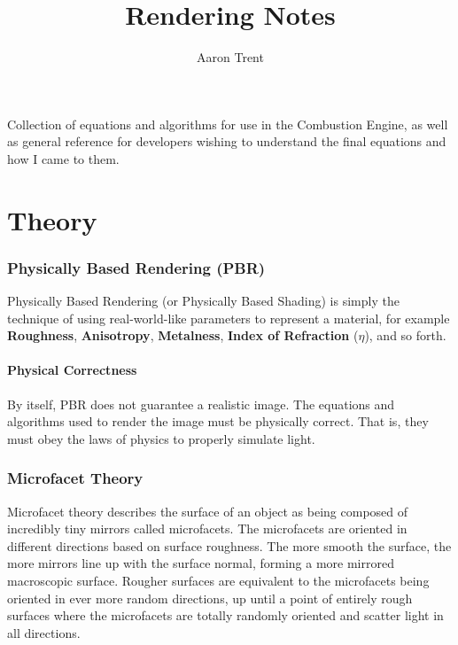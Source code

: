 \documentclass[12pt,letterpaper]{article}
\author{Aaron Trent}
\title{Rendering Notes}
\begin{document}
\maketitle

\begin{center}
Collection of equations and algorithms for use in the Combustion Engine, 
as well as general reference for developers wishing to understand the final equations and how I came to them.
\end{center}

\tableofcontents

\setlength{\parindent}{4em}
\setlength{\parskip}{0.8em}

\newpage

\part{Theory}

\section{Physically Based Rendering (PBR)}

Physically Based Rendering (or Physically Based Shading) is simply the technique of using real-world-like parameters to represent
a material, for example \textbf{Roughness}, \textbf{Anisotropy}, \textbf{Metalness}, \textbf{Index of Refraction} ($\eta$), and so forth.

\subsection{Physical Correctness}

By itself, PBR does not guarantee a realistic image. The equations and algorithms used to render the image must be physically correct.
That is, they must obey the laws of physics to properly simulate light.

\section{Microfacet Theory}

Microfacet theory describes the surface of an object as being composed of incredibly tiny mirrors called microfacets. 
The microfacets are oriented in different directions based on surface roughness. The more smooth the surface, the more mirrors line up with the surface normal,
forming a more mirrored macroscopic surface. Rougher surfaces are equivalent to the microfacets being oriented in ever more random directions,
up until a point of entirely rough surfaces where the microfacets are totally randomly oriented and 
scatter light in all directions.
\end{document}
